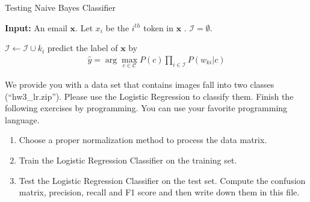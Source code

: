\documentclass[11pt,letter,notitlepage]{article}
\begin{document}
\begin{algorithm}
\caption{Testing Naive Bayes Classifier }
\label{alg:test_bayes}
\textbf{Input:} An email $\textbf{x}$. Let $x_i$ be the $i^{th}$ token in $\textbf{x}$ . $\mathcal{I}=\emptyset.$
\begin{algorithmic}[1]
\STATE $\mathcal{I}\leftarrow\mathcal{I}\cup k_i$
\ENDIF
\ENDFOR
\STATE predict the label of $\textbf{x}$ by 
\begin{align*}
    \hat{y}=\arg\max_{c\in\mathcal{C}} P(c)\prod_{i\in\mathcal{I}}P(w_{ki}|c)
\end{align*}
\end{algorithmic}
\end{algorithm}

\newpage
\begin{exercise}
We provide you with a data set that contains images fall into two classes (``hw3\_lr.zip''). Please use the Logistic Regression to classify them.
Finish the following exercises by programming. You can use your favorite programming language.
\begin{enumerate}
\item Choose a proper normalization method to process the data matrix.
\item Train the Logistic Regression Classifier on the training set.
\item Test the Logistic Regression Classifier on the test set. Compute the confusion matrix, precision, recall and F1 score and then write down them in this file.
\end{enumerate}
\end{exercise}




\end{document}

